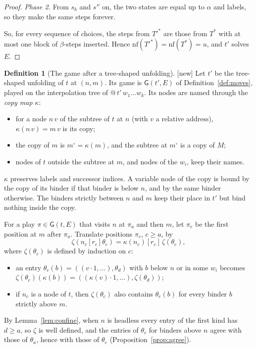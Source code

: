 \documentclass[11pt]{article}
\newcommand{\Gm}{\mathsf{G}}
\newcommand{\suc}[2]{#1{\cdot}#2}
\newcommand{\New}{\textsf{[new]}}
\theoremstyle{plain}
\theoremstyle{definition}
\newtheorem{definition}[theorem]{Definition}
\theoremstyle{remark}
\begin{document}
\begin{proof}
\emph{Phase 2.}  From $s_k$ and $s''$ on, the two states are equal up
to $\alpha$ and labels, so they make the same steps forever.

So, for every sequence of choices, the steps from $T'^*$ are those from
$T^*$ with at most one block of $\beta$-steps inserted.  Hence
$\mathrm{nf}(T'^*)=\mathrm{nf}(T^*)=u$, and $t'$ solves $E$.
\end{proof}

\begin{definition}[The game after a tree-shaped unfolding]\label{def:treegame}
\New{} Let $t'$ be the tree-shaped unfolding of $t$ at $(n,m)$.  Its game
is $\Gm(t',E)$ of Definition~\ref{def:moves}, played on the
interpolation tree of $@\,t'\,w_1\dots w_k$.  Its nodes are named
through the \emph{copy map} $\kappa$:
\begin{itemize}
\item for a node $n\,v$ of the subtree of $t$ at $n$ (with $v$ a
  relative address), $\kappa(n\,v)=m\,v$ is its copy;
\item the copy of $m$ is $m^\circ=\kappa(m)$, and the subtree at
  $m^\circ$ is a copy of $M$;
\item nodes of $t$ outside the subtree at $m$, and nodes of the $w_i$,
  keep their names.
\end{itemize}
$\kappa$ preserves labels and successor indices.  A variable node of the
copy is bound by the copy of its binder if that binder is below $n$, and
by the same binder otherwise.  The binders strictly between $n$ and $m$
keep their place in $t'$ but bind nothing inside the copy.
\end{definition}

For a play $\pi\in\Gm(t,E)$ that visits $n$ at $\pi_a$ and then $m$,
let $\pi_e$ be the first position at $m$ after $\pi_a$.  Translate
positions $\pi_c$, $c\ge a$, by
\[
\zeta(n_c[r_c]\theta_c)=\kappa(n_c)[r_c]\,\zeta(\theta_c),
\]
where $\zeta(\theta_c)$ is defined by induction on $c$:
\begin{itemize}
\item an entry $\theta_c(b)=((\suc v1,\dots),\theta_d)$ with $b$ below
  $n$ or in some $w_i$ becomes
  $\zeta(\theta_c)(\kappa(b))=((\suc{\kappa(v)}1,\dots),\zeta(\theta_d))$;
\item if $n_c$ is a node of $t$, then $\zeta(\theta_c)$ also contains
  $\theta_e(b)$ for every binder $b$ strictly above $m$.
\end{itemize}
By Lemma~\ref{lem:confine}, when $n$ is headless every entry of the
first kind has $d\ge a$, so $\zeta$ is well defined, and the entries of
$\theta_c$ for binders above $n$ agree with those of $\theta_a$, hence
with those of $\theta_e$ (Proposition~\ref{prop:agree}).
\end{document}
